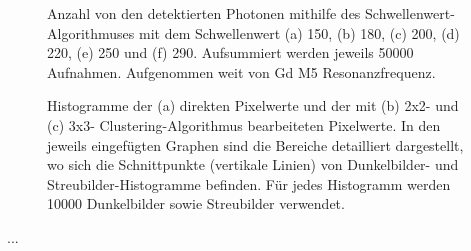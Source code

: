 \begin{figure}[H]
    \centering
    
    \caption{Anzahl von den detektierten Photonen mithilfe des Schwellenwert-Algorithmuses mit dem Schwellenwert (a) \SI{150}{\adu}, (b) \SI{180}{\adu}, (c) \SI{200}{\adu}, (d) \SI{220}{\adu}, (e) \SI{250}{\adu} und (f) \SI{290}{\adu}. Aufsummiert werden jeweils \num{50000} Aufnahmen. Aufgenommen weit von Gd M5 Resonanzfrequenz.}
    \label{fig:cl_150_180_200_220_250_290_off_resonance}
\end{figure}
\begin{figure}[H]
    \centering
    
    \caption{Histogramme der (a) direkten Pixelwerte und der mit (b) 2x2- und (c) 3x3- Clustering-Algorithmus bearbeiteten Pixelwerte. In den jeweils eingefügten Graphen sind die Bereiche detailliert dargestellt, wo sich die Schnittpunkte (vertikale Linien) von Dunkelbilder- und Streubilder-Histogramme befinden. Für jedes Histogramm werden \num{10000} Dunkelbilder sowie Streubilder verwendet.}
    \label{fig:no_pr_cl_2_cl_3_histograms}
\end{figure}
...